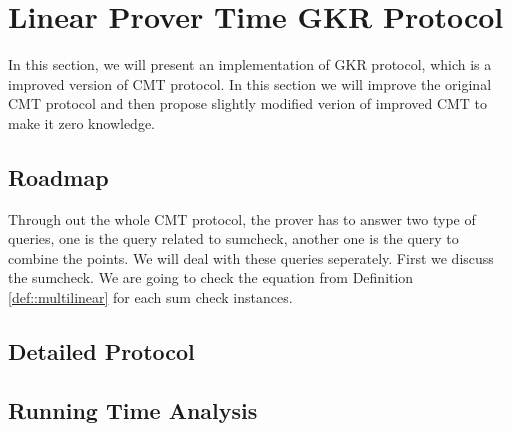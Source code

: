 \section{Linear Prover Time GKR Protocol}
In this section, we will present an implementation of GKR protocol\cite{GKR}, which is a improved version of CMT protocol\cite{CMT}. In this section we will improve the original CMT protocol and then propose slightly modified verion of improved CMT to make it zero knowledge.

\subsection{Roadmap}
Through out the whole CMT protocol, the prover has to answer two type of queries, one is the query related to sumcheck, another one is the query to combine the points. We will deal with these queries seperately. First we discuss the sumcheck. We are going to check the equation from Definition \ref{def::multilinear} for each sum check instances. 
\subsection{Detailed Protocol}
\subsection{Running Time Analysis}